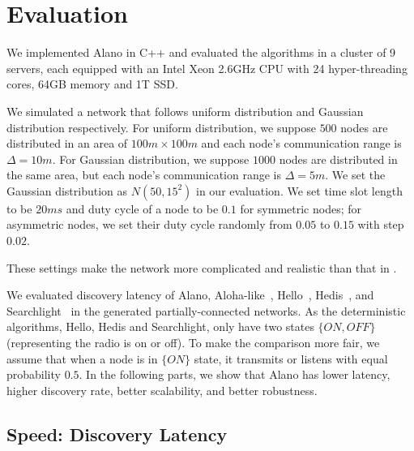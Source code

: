 \section{Evaluation}
\label{Evaluation}


We implemented Alano in C++ and evaluated the algorithms in a cluster of 9 servers,
each equipped with an Intel Xeon 2.6GHz CPU with 24 hyper-threading cores, 64GB memory and 1T SSD.

We simulated a network that follows uniform distribution and Gaussian distribution respectively.
For uniform distribution, we suppose $500$ nodes are distributed in an area of $100m \times 100m$ and each node's communication range is $\Delta = 10m$. For Gaussian distribution, we suppose $1000$ nodes are distributed in the same area, but each node's communication range is $\Delta = 5m$. We set the Gaussian distribution as $N(50,15^2)$ in our evaluation.
We set time slot length to be $20ms$ and duty cycle of a node to be $0.1$ for symmetric nodes; for asymmetric nodes, we set their duty cycle randomly from $0.05$ to $0.15$ with step $0.02$.

These settings make the network more complicated and realistic than that in
\cite{wang2015blinddate, qiu2016talk, sun2014hello, bakht2012searchlight,
chen2015heterogeneous, kandhalu2010u, you2011aloha,
mcglynn2001birthday, song2014probabilistic, vasudevan2009neighbor}.



We evaluated discovery latency of Alano, Aloha-like~\cite{you2011aloha}, Hello~\cite{sun2014hello}, Hedis~\cite{chen2015heterogeneous}, and Searchlight~\cite{bakht2012searchlight} in the generated partially-connected networks. 
As the deterministic algorithms, Hello, Hedis and Searchlight, only have two states $\{ON, OFF\}$ (representing the radio is on or off). To make the comparison more fair, we assume that when a node is in $\{ON\}$ state, it transmits or listens with equal probability $0.5$.
In the following parts, we show that Alano has lower latency, higher discovery rate, better scalability, and better robustness.

\subsection{Speed: Discovery Latency}

